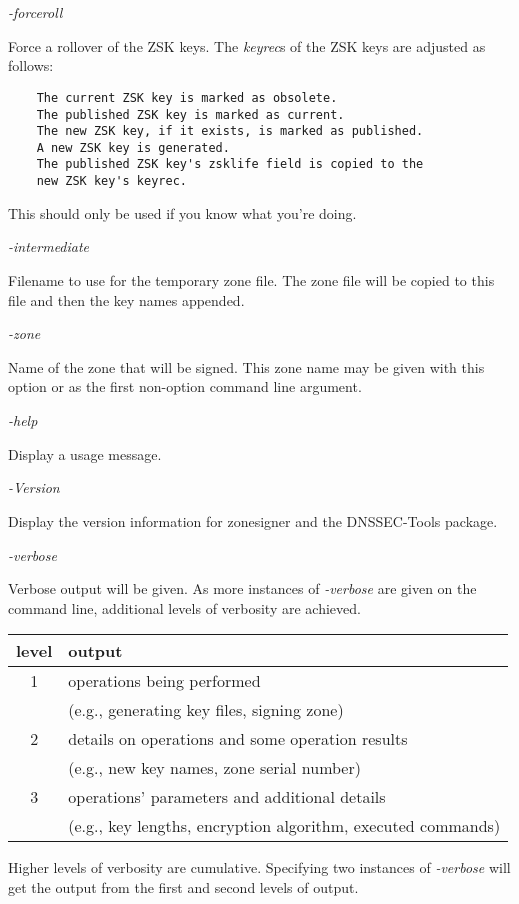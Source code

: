 \begin{description}
\item {\it -forceroll}\verb" "

Force a rollover of the ZSK keys.  The {\it keyrec}s of the ZSK keys are
adjusted as follows:

\begin{verbatim}
    The current ZSK key is marked as obsolete.
    The published ZSK key is marked as current.
    The new ZSK key, if it exists, is marked as published.
    A new ZSK key is generated.
    The published ZSK key's zsklife field is copied to the
    new ZSK key's keyrec.
\end{verbatim}

This should only be used if you know what you're doing.

\item {\it -intermediate}\verb" "

Filename to use for the temporary zone file.  The zone file will be copied to
this file and then the key names appended.

\item {\it -zone}\verb" "

Name of the zone that will be signed.  This zone name may be given with this
option or as the first non-option command line argument.

\item {\it -help}\verb" "

Display a usage message.

\item {\it -Version}\verb" "

Display the version information for zonesigner and the DNSSEC-Tools package.

\item {\it -verbose}\verb" "

Verbose output will be given.  As more instances of {\it -verbose} are given on
the command line, additional levels of verbosity are achieved.

\begin{table}[ht]
\begin{center}
\begin{tabular}{c|l}
level  & output							 \\
\hline
1 & operations being performed					 \\
  & (e.g., generating key files, signing zone)			 \\
2 & details on operations and some operation results		 \\
  & (e.g., new key names, zone serial number)			 \\
3 & operations' parameters and additional details		 \\
  & (e.g., key lengths, encryption algorithm, executed commands) \\
\end{tabular} 
\end{center}
\end{table}

Higher levels of verbosity are cumulative.  Specifying two instances of
{\it -verbose} will get the output from the first and second levels of output.

\end{description}

